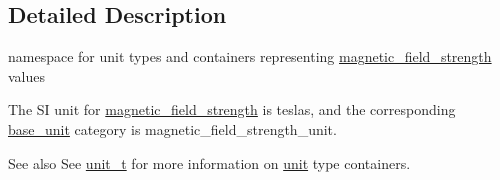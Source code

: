 \subsection{Detailed Description}
namespace for unit types and containers representing \hyperlink{namespaceunits_1_1magnetic__field__strength}{magnetic\+\_\+field\+\_\+strength} values 

The S\+I unit for \hyperlink{namespaceunits_1_1magnetic__field__strength}{magnetic\+\_\+field\+\_\+strength} is {\ttfamily teslas}, and the corresponding {\ttfamily \hyperlink{structunits_1_1base__unit}{base\+\_\+unit}} category is {\ttfamily magnetic\+\_\+field\+\_\+strength\+\_\+unit}. \begin{DoxySeeAlso}{See also}
See \hyperlink{classunits_1_1unit__t}{unit\+\_\+t} for more information on \hyperlink{structunits_1_1unit}{unit} type containers. 
\end{DoxySeeAlso}
